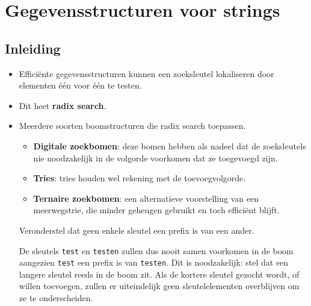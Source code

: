 \chapter{Gegevensstructuren voor strings}
\section{Inleiding}
\begin{itemize}
    \item Efficiënte gegevensstructuren kunnen een zoeksleutel lokaliseren door elementen één voor één te testen.
    \item Dit heet \textbf{radix search}.
    \item Meerdere soorten boomstructuren die radix search toepassen.
    \begin{itemize}
        \item \textbf{Digitale zoekbomen}: deze bomen hebben als nadeel dat de zoeksleutels nie noodzakelijk in de volgorde voorkomen dat ze toegevoegd zijn.
        \item \textbf{Tries}: tries houden wel rekening met de toevoegvolgorde.
        \item \textbf{Ternaire zoekbomen}: een alternatieve voorstelling van een meerwegstrie, die minder geheugen gebruikt en toch efficiënt blijft.
    \end{itemize}
    \alert Veronderstel dat geen enkele sleutel een prefix is van een ander.

    De sleutels \texttt{test} en \texttt{testen} zullen dus nooit samen voorkomen in de boom aangezien \texttt{test} een prefix is van \texttt{testen}. Dit is noodzakelijk: stel dat een langere sleutel reeds in de boom zit. Als de kortere sleutel gezocht wordt, of willen toevoegen, zullen er uiteindelijk geen sleutelelementen overblijven om ze te onderscheiden.
\end{itemize}


